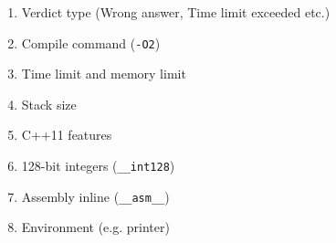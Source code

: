\begin{enumerate}
\item Verdict type (Wrong answer, Time limit exceeded etc.)
\item Compile command (\texttt{-O2})
\item Time limit and memory limit
\item Stack size
\item C++11 features
\item 128-bit integers (\texttt{\_\_int128})
\item Assembly inline (\texttt{\_\_asm\_\_})
\item Environment (e.g. printer)
\end{enumerate}


